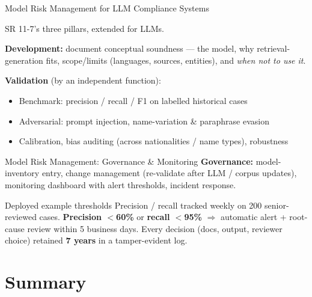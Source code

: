 \documentclass[9pt,t]{beamer}
\begin{document}
\begin{frame}{Model Risk Management for LLM Compliance Systems}
\begin{underhood}
SR 11-7's three pillars, extended for LLMs.
\end{underhood}

\medskip
\textbf{Development:} document conceptual soundness --- the model, why
retrieval-generation fits, scope/limits (languages, sources, entities), and
\emph{when not to use it}.

\smallskip
\textbf{Validation} (by an independent function):
\begin{itemize}\footnotesize
  \item Benchmark: precision / recall / F1 on labelled historical cases
  \item Adversarial: prompt injection, name-variation \& paraphrase evasion
  \item Calibration, bias auditing (across nationalities / name types), robustness
\end{itemize}
\end{frame}

\begin{frame}{Model Risk Management: Governance \& Monitoring}
\textbf{Governance:} model-inventory entry, change management (re-validate after
LLM / corpus updates), monitoring dashboard with alert thresholds, incident
response.

\medskip
\begin{exampleblock}{Deployed example thresholds}
Precision / recall tracked weekly on 200 senior-reviewed cases. \textbf{Precision
$<$60\%} or \textbf{recall $<$95\%} $\Rightarrow$ automatic alert + root-cause
review within 5 business days. Every decision (docs, output, reviewer choice)
retained \textbf{7 years} in a tamper-evident log.
\end{exampleblock}
\end{frame}

\section{Summary}
\end{document}

